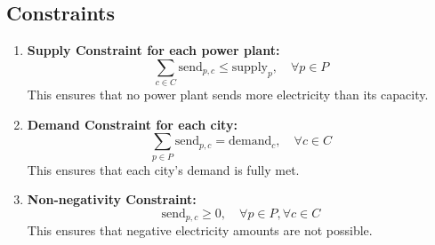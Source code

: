 \documentclass{article}
\begin{document}
\subsection*{Constraints}
\begin{enumerate}
    \item \textbf{Supply Constraint for each power plant:}
    \[
    \sum_{c \in C} \text{send}_{p,c} \leq \text{supply}_p, \quad \forall p \in P
    \]
    This ensures that no power plant sends more electricity than its capacity.

    \item \textbf{Demand Constraint for each city:}
    \[
    \sum_{p \in P} \text{send}_{p,c} = \text{demand}_c, \quad \forall c \in C
    \]
    This ensures that each city's demand is fully met.

    \item \textbf{Non-negativity Constraint:}
    \[
    \text{send}_{p,c} \geq 0, \quad \forall p \in P, \forall c \in C
    \]
    This ensures that negative electricity amounts are not possible.
\end{enumerate}
\end{document}
